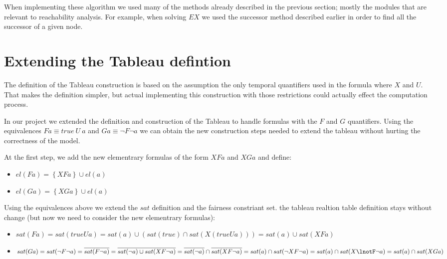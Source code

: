 \documentclass[11pt]{article}
\begin{document}
        When implementing these algorithm we used many of the methods already
        described in the previous section; mostly the modules that are relevant
        to reachability analysis. For example, when solving $EX$ we used the
        successor method described earlier in order to find all the successor
        of a given node.

\section{Extending the Tableau defintion}
    The definition of the Tableau construction is based on the assumption the only temporal quantifiers
    used in the formula where $X$ and $U$. That makes the definition simpler, but actual implementing this
    construction with those restrictions could actually effect the computation process.

    In our project we extended the definition and construction of the Tableau to handle formulas with the
    $F$ and $G$ quantifiers. Using the equivalences $Fa \equiv true\ U\ a$ and $Ga \equiv \lnot F \lnot a$
    we can obtain the new construction steps needed to extend the tableau without hurting the correctness
    of the model.

    At the first step, we add the new elementrary formulas of the form $XFa$ and $XGa$ and define:

    \begin{itemize}
        \item $el(Fa) = \left\{XFa\right\} \cup el(a)$
        \item $el(Ga) = \left\{XGa\right\} \cup el(a)$
    \end{itemize}

    Using the equivalences above we extend the $sat$ definition and the fairness constriant set. the tableau realtion table definition
    stays without change (but now we need to consider the new elementrary formulas):

    \begin{itemize}
        \item $sat(F a) = sat(true U a) = sat(a) \cup (sat(true) \cap sat(X(true U a))) = sat(a) \cup sat(XFa)$
        \item $sat(G a) = sat(\lnot F \lnot a) = \overline{sat(F \lnot a)} = \overline{sat(\lnot a) \cup sat(XF\lnot a)} =
        \overline{sat(\lnot a)} \cap \overline{sat(XF\lnot a)} = sat(a) \cap sat(\lnot XF\lnot a) = sat(a) \cap sat(X\lnotF\lnot a) = sat(a) \cap sat(XGa)$
    \end{itemize}
\end{document}

